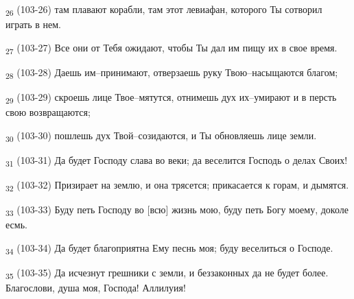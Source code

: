 \begin{tcolorbox}
\textsubscript{26} (103-26) там плавают корабли, там этот левиафан, которого Ты сотворил играть в нем.
\end{tcolorbox}
\begin{tcolorbox}
\textsubscript{27} (103-27) Все они от Тебя ожидают, чтобы Ты дал им пищу их в свое время.
\end{tcolorbox}
\begin{tcolorbox}
\textsubscript{28} (103-28) Даешь им--принимают, отверзаешь руку Твою--насыщаются благом;
\end{tcolorbox}
\begin{tcolorbox}
\textsubscript{29} (103-29) скроешь лице Твое--мятутся, отнимешь дух их--умирают и в персть свою возвращаются;
\end{tcolorbox}
\begin{tcolorbox}
\textsubscript{30} (103-30) пошлешь дух Твой--созидаются, и Ты обновляешь лице земли.
\end{tcolorbox}
\begin{tcolorbox}
\textsubscript{31} (103-31) Да будет Господу слава во веки; да веселится Господь о делах Своих!
\end{tcolorbox}
\begin{tcolorbox}
\textsubscript{32} (103-32) Призирает на землю, и она трясется; прикасается к горам, и дымятся.
\end{tcolorbox}
\begin{tcolorbox}
\textsubscript{33} (103-33) Буду петь Господу во [всю] жизнь мою, буду петь Богу моему, доколе есмь.
\end{tcolorbox}
\begin{tcolorbox}
\textsubscript{34} (103-34) Да будет благоприятна Ему песнь моя; буду веселиться о Господе.
\end{tcolorbox}
\begin{tcolorbox}
\textsubscript{35} (103-35) Да исчезнут грешники с земли, и беззаконных да не будет более. Благослови, душа моя, Господа! Аллилуия!
\end{tcolorbox}
